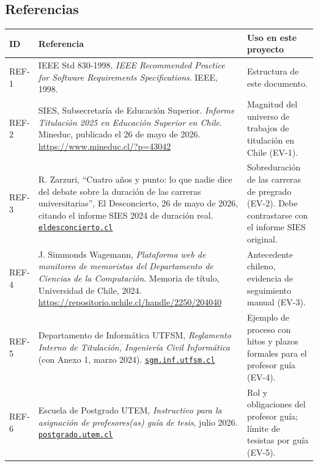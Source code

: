 \documentclass[10pt,a4paper]{article}
\newcommand{\hrow}{\rowcolor{encabezado}}
\newcommand{\h}[1]{\textbf{#1}}
\newcommand{\nota}[1]{{\small\itshape\color{nota}#1\par}}
\begin{document}
\subsection{Referencias}
\begin{xltabular}{\linewidth}{|P{1.6cm}|L|P{5.5cm}|}
\hline\hrow \h{ID} & \h{Referencia} & \h{Uso en este proyecto} \\ \hline
\endhead
REF-1 & IEEE Std 830-1998, \emph{IEEE Recommended Practice for Software Requirements Specifications}. IEEE, 1998. & Estructura de este documento. \\ \hline
REF-2 & SIES, Subsecretaría de Educación Superior. \emph{Informe Titulación 2025 en Educación Superior en Chile}. Mineduc, publicado el 26 de mayo de 2026. \url{https://www.mineduc.cl/?p=43042} & Magnitud del universo de trabajos de titulación en Chile (EV-1). \\ \hline
REF-3 & R. Zarzuri, ``Cuatro años y punto: lo que nadie dice del debate sobre la duración de las carreras universitarias'', El Desconcierto, 26 de mayo de 2026, citando el informe SIES 2024 de duración real. \href{https://eldesconcierto.cl/opinion/cuatro-anos-y-punto-lo-que-nadie-dice-del-debate-la-duracion-las-carreras-universitarias-n5459014}{\texttt{eldesconcierto.cl}} & Sobreduración de las carreras de pregrado (EV-2). Debe contrastarse con el informe SIES original. \\ \hline
REF-4 & J. Simmonds Wagemann, \emph{Plataforma web de monitoreo de memoristas del Departamento de Ciencias de la Computación}. Memoria de título, Universidad de Chile, 2024. \url{https://repositorio.uchile.cl/handle/2250/204040} & Antecedente chileno, evidencia de seguimiento manual (EV-3). \\ \hline
REF-5 & Departamento de Informática UTFSM, \emph{Reglamento Interno de Titulación, Ingeniería Civil Informática} (con Anexo 1, marzo 2024). \href{https://sgm.inf.utfsm.cl/uploads/documentacion/51_Reglamento_Titulacion_INF_(+Anexo_1marzo24).pdf}{\texttt{sgm.inf.utfsm.cl}} & Ejemplo de proceso con hitos y plazos formales para el profesor guía (EV-4). \\ \hline
REF-6 & Escuela de Postgrado UTEM, \emph{Instructivo para la asignación de profesores(as) guía de tesis}, julio 2026. \href{https://postgrado.utem.cl/wp-content/uploads/2026/07/INSTRUCTIVO-PARA-LA-ASIGNACION-DE-PROFESORESAS-GUIA-DE-TESIS.pdf}{\texttt{postgrado.utem.cl}} & Rol y obligaciones del profesor guía; límite de tesistas por guía (EV-5). \\ \hline

\end{xltabular}
\end{document}
